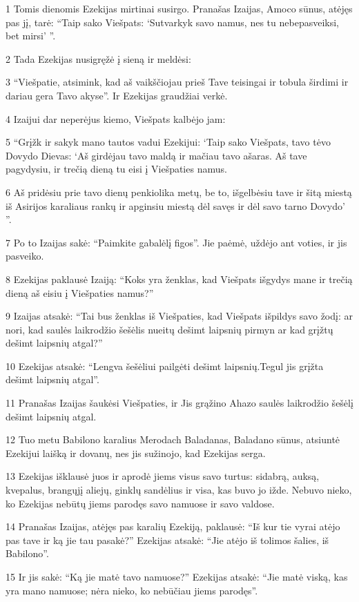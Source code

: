 \par 1 Tomis dienomis Ezekijas mirtinai susirgo. Pranašas Izaijas, Amoco sūnus, atėjęs pas jį, tarė: “Taip sako Viešpats: ‘Sutvarkyk savo namus, nes tu nebepasveiksi, bet mirsi’ ”. 
\par 2 Tada Ezekijas nusigręžė į sieną ir meldėsi: 
\par 3 “Viešpatie, atsimink, kad aš vaikščiojau prieš Tave teisingai ir tobula širdimi ir dariau gera Tavo akyse”. Ir Ezekijas graudžiai verkė. 
\par 4 Izaijui dar neperėjus kiemo, Viešpats kalbėjo jam: 
\par 5 “Grįžk ir sakyk mano tautos vadui Ezekijui: ‘Taip sako Viešpats, tavo tėvo Dovydo Dievas: ‘Aš girdėjau tavo maldą ir mačiau tavo ašaras. Aš tave pagydysiu, ir trečią dieną tu eisi į Viešpaties namus. 
\par 6 Aš pridėsiu prie tavo dienų penkiolika metų, be to, išgelbėsiu tave ir šitą miestą iš Asirijos karaliaus rankų ir apginsiu miestą dėl savęs ir dėl savo tarno Dovydo’ ”. 
\par 7 Po to Izaijas sakė: “Paimkite gabalėlį figos”. Jie paėmė, uždėjo ant voties, ir jis pasveiko. 
\par 8 Ezekijas paklausė Izaiją: “Koks yra ženklas, kad Viešpats išgydys mane ir trečią dieną aš eisiu į Viešpaties namus?” 
\par 9 Izaijas atsakė: “Tai bus ženklas iš Viešpaties, kad Viešpats išpildys savo žodį: ar nori, kad saulės laikrodžio šešėlis nueitų dešimt laipsnių pirmyn ar kad grįžtų dešimt laipsnių atgal?” 
\par 10 Ezekijas atsakė: “Lengva šešėliui pailgėti dešimt laipsnių.Tegul jis grįžta dešimt laipsnių atgal”. 
\par 11 Pranašas Izaijas šaukėsi Viešpaties, ir Jis grąžino Ahazo saulės laikrodžio šešėlį dešimt laipsnių atgal. 
\par 12 Tuo metu Babilono karalius Merodach Baladanas, Baladano sūnus, atsiuntė Ezekijui laišką ir dovanų, nes jis sužinojo, kad Ezekijas serga. 
\par 13 Ezekijas išklausė juos ir aprodė jiems visus savo turtus: sidabrą, auksą, kvepalus, brangųjį aliejų, ginklų sandėlius ir visa, kas buvo jo ižde. Nebuvo nieko, ko Ezekijas nebūtų jiems parodęs savo namuose ir savo valdose. 
\par 14 Pranašas Izaijas, atėjęs pas karalių Ezekiją, paklausė: “Iš kur tie vyrai atėjo pas tave ir ką jie tau pasakė?” Ezekijas atsakė: “Jie atėjo iš tolimos šalies, iš Babilono”. 
\par 15 Ir jis sakė: “Ką jie matė tavo namuose?” Ezekijas atsakė: “Jie matė viską, kas yra mano namuose; nėra nieko, ko nebūčiau jiems parodęs”. 

